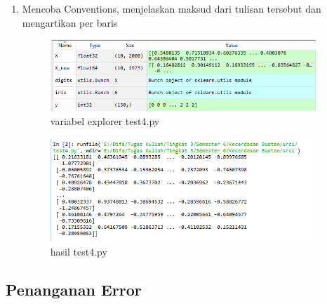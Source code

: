 \begin{enumerate}
	
		\item Mencoba Conventions, menjelaskan maksud dari tulisan tersebut dan mengartikan per baris
						
	
			\begin{figure}[H]
				\begin{center}
				 \includegraphics[width=10cm]{figures/1174076/figures1/test4ve.png}
				 \caption{variabel explorer test4.py}	
				\end{center}
			\end{figure}
			
			\begin{figure}[H]
				\begin{center}
				 \includegraphics[width=10cm]{figures/1174076/figures1/test4.png}
				 \caption{hasil test4.py}	
				\end{center}
			\end{figure}
	
	\end{enumerate}
	

\subsection{Penanganan Error}

